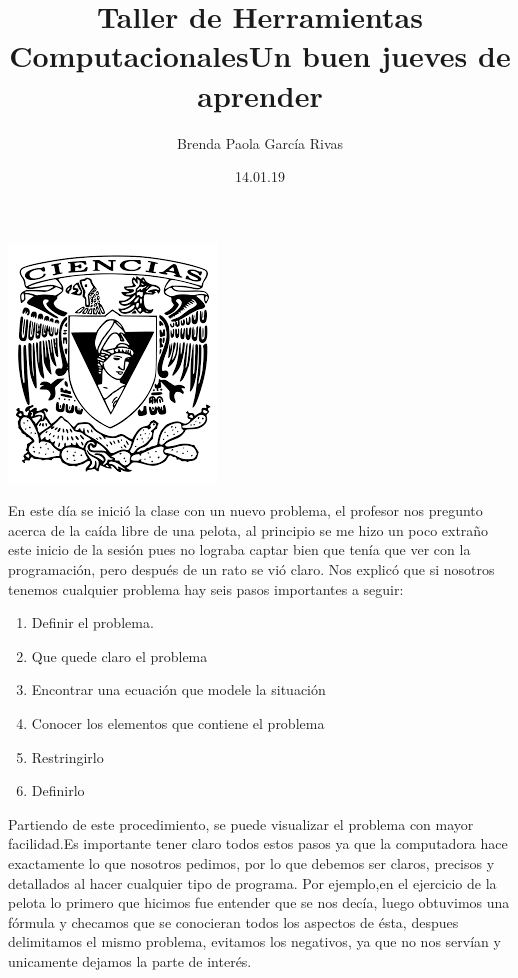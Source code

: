 \documentclass[letterpaper, 12pt,oneside]{article}
\title{\huge\color{orange}Taller de Herramientas Computacionales}
\author{Brenda Paola García Rivas}
\date{14.01.19}
\begin{document}
	\maketitle
	\begin{center}
		\includegraphics[scale=0.98]{1.png}
	\end{center}
	\newpage
	\title{\huge Un buen jueves de aprender\\}
	
	En este día se inició la clase con un nuevo problema, el profesor nos pregunto acerca de la caída libre de una pelota, al principio se me hizo un poco extraño este inicio de la sesión pues no lograba captar bien que tenía que ver con la programación, pero después de un rato se vió claro. 
	Nos explicó que si nosotros tenemos cualquier problema hay seis pasos importantes a seguir:
	\begin{enumerate}
		\item
		Definir el problema. 
		\item 
		Que quede claro el problema
		\item 
		Encontrar una ecuación que modele la situación
		\item 
		Conocer los elementos que contiene el problema
		\item 
		Restringirlo
		\item 
		Definirlo
	\end{enumerate}
	Partiendo de este procedimiento, se puede visualizar el problema con mayor facilidad.Es importante tener claro todos estos pasos ya que la computadora hace exactamente lo que nosotros pedimos, por lo que debemos ser claros, precisos y detallados al hacer cualquier tipo de programa.
	Por ejemplo,en el ejercicio de la pelota lo primero que hicimos fue entender que se nos decía, luego obtuvimos una fórmula y checamos que se conocieran todos los aspectos de ésta, despues delimitamos el mismo problema, evitamos los negativos, ya que no nos servían y unicamente dejamos la parte de interés.
	
\end{document}
